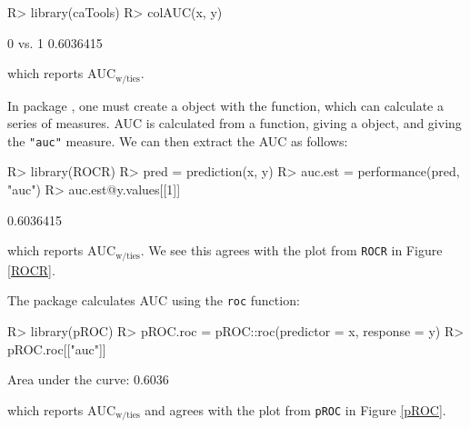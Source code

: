 \documentclass[article]{jss}
\begin{document}
\begin{CodeChunk}

\begin{CodeInput}
R> library(caTools)
R> colAUC(x, y)
\end{CodeInput}

\begin{CodeOutput}
             [,1]
0 vs. 1 0.6036415
\end{CodeOutput}
\end{CodeChunk}

which reports \(\text{AUC}_{\text{w/ties}}\).

In  package \citep{ROCR}, one must create a 
object with the  function, which can calculate a series
of measures. AUC is calculated from a  function,
giving a  object, and giving the \texttt{"auc"}
measure. We can then extract the AUC as follows:

\begin{CodeChunk}

\begin{CodeInput}
R> library(ROCR)
R> pred = prediction(x, y)
R> auc.est = performance(pred, "auc")
R> auc.est@y.values[[1]]
\end{CodeInput}

\begin{CodeOutput}
[1] 0.6036415
\end{CodeOutput}
\end{CodeChunk}

which reports \(\text{AUC}_{\text{w/ties}}\). We see this agrees with
the plot from \texttt{ROCR} in Figure \ref{ROCR}.

The  \citep{pROC} package calculates AUC using the
\texttt{roc} function:

\begin{CodeChunk}

\begin{CodeInput}
R> library(pROC)
R> pROC.roc = pROC::roc(predictor = x, response = y)
R> pROC.roc[["auc"]]
\end{CodeInput}

\begin{CodeOutput}
Area under the curve: 0.6036
\end{CodeOutput}
\end{CodeChunk}

which reports \(\text{AUC}_{\text{w/ties}}\) and agrees with the plot
from \texttt{pROC} in Figure \ref{pROC}.
\end{document}
